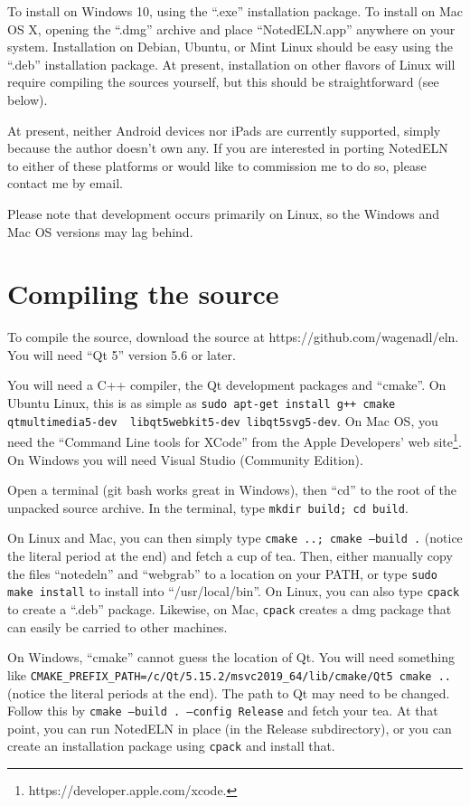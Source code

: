 \documentclass[11pt]{report}
\def\terminal#1{{\tt#1}}
\begin{document}
To install on Windows 10, using the ``.exe'' installation
package. To install on Mac OS X, opening the ``.dmg'' archive and
place ``NotedELN.app'' anywhere on your system.  Installation on
Debian, Ubuntu, or Mint Linux should be easy using the
``.deb'' installation package. At present, installation on other
flavors of Linux will require compiling the sources yourself, but this
should be straightforward (see below).

At present, neither Android devices nor iPads are currently supported,
simply because the author doesn't own any. If you are interested in
porting NotedELN to either of these platforms or would like to commission
me to do so, please contact me by email.

Please note that development occurs primarily on Linux, so the Windows
and Mac OS versions may lag behind.

\section{Compiling the source}
To compile the source, download the source at https://github.com/wagenadl/eln. You will need
``Qt 5'' version 5.6 or later.

You will need a C++ compiler, the Qt development packages and
``cmake''. On Ubuntu Linux, this is as simple as \terminal{sudo
  apt-get install g++ cmake qtmultimedia5-dev
  \ libqt5webkit5-dev libqt5svg5-dev}.  On Mac OS, you need the
``Command Line tools for XCode'' from the Apple Developers' web
site\footnote{https://developer.apple.com/xcode.}. On Windows you will
need Visual Studio (Community Edition).

Open a terminal (git bash works great in Windows), then ``cd'' to the
root of the unpacked source archive. In the terminal, type
\terminal{mkdir build; cd build}.

On Linux and Mac, you can then simply type \terminal{cmake ..; cmake
  --build .} (notice the literal period at the end) and fetch a cup of tea. Then, either manually copy the
files ``notedeln'' and ``webgrab'' to a location on your PATH, or type
\terminal{sudo make install} to install into ``/usr/local/bin''. On
Linux, you can also type \terminal {cpack} to create a ``.deb''
package. Likewise, on Mac, \terminal{cpack} creates a dmg package that
can easily be carried to other machines.

On Windows, ``cmake'' cannot guess the location of Qt. You will need
something like
\terminal{CMAKE\_PREFIX\_PATH=/c/Qt/5.15.2/msvc2019\_64/lib/cmake/Qt5
  cmake ..} (notice the literal periods at the end).  The path to Qt
may need to be changed. Follow this by \terminal{cmake --build . --config
  Release} and fetch your tea. At that point, you can run NotedELN in place (in the
Release subdirectory), or you can create an installation package using
\terminal{cpack} and install that.
\end{document}
